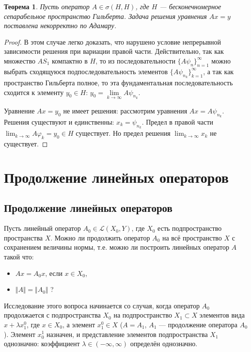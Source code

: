 \documentclass[12pt,a4paper,titlepage,oneside]{book}
\theoremstyle{definition}
\theoremstyle{plain}
\newtheorem*{theorem}{Теорема}
\theoremstyle{break}
\theoremstyle{remark}
\theoremstyle{remark}
\theoremstyle{remark}
\theoremstyle{remark}
\theoremstyle{plain}
\theoremstyle{plain}
\begin{document}
\begin{theorem}
Пусть оператор $A \in \sigma (H,H)$, где $H$ --- бесконечномерное сепарабельное пространство Гильберта. Задача решения уравнения $Ax=y$ поставлена некорректно по Адамару.
\end{theorem}

\begin{proof}
В этом случае легко доказать, что нарушено условие непрерывной зависимости решения при вариации правой части. Действительно, так как множество $AS_1$ компактно в $H$, то из последовательности $\lbrace A \psi_n\rbrace_{n=1}^{\infty}$ можно выбрать сходящуюся подпоследовательность элементов $\lbrace A \psi_{n_k}\rbrace_{k=1}^{\infty}$, а так как пространство Гильберта полное, то эта фундаментальная последовательность сходится к элементу $y_0 \in H$: $y_0=\underset{k \to \infty}{\lim} A \psi_{n_k}$.

Уравнение $Ax = y_0$ не имеет решения: рассмотрим уравнения $Ax = A \psi_{n_k}$. Решения существуют и единственны: $x_k = \psi_{n_k}$. Предел в правой части $\displaystyle\lim_{k \to \infty} A \varphi_k = y_0 \in H$ существует. Но предел решения $\displaystyle\lim_{k \to \infty} x_k$ не существует.
\end{proof}

\chapter{Продолжение линейных операторов}

\section{Продолжение линейных операторов}
Пусть линейный оператор $A_0\in \mathcal{L}(X_0,Y)$, где $X_0$ есть подпространство пространства $X$. Можно ли продолжить оператор $A_0$ на всё пространство $X$ с сохранением величины нормы, т.е. можно ли построить линейных оператор $A$ такой что:
\begin{itemize}
 \item $Ax = A_0x$, если $x\in X_0$,
 \item $\Vert A \Vert = \Vert A_0 \Vert$ ?
\end{itemize}

Исследование этого вопроса начинается со случая, когда оператор $A_0$ продолжается с подпространства $X_0$ на подпространство $X_1\subset X$ элементов вида $x+\lambda x_1^0$, где $x\in X_0$, а элемент $x_1^0 \in X$ ($A = A_1$, $A_1$ --- продолжение оператора $A_0$). Элемент $x_0^1$ назначен, и представление элементов подпространства $X_1$ однозначно: коэффициент $\lambda \in (-\infty , \infty)$ определён однозначно. 
\end{document}
